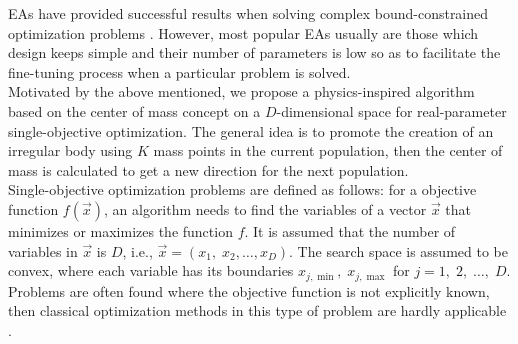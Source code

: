 \documentclass{svproc}
\begin{document}
EAs have provided successful results when solving complex bound-constrained 
optimization problems \cite{ed1995}.  However, most popular EAs usually are 
those which design keeps simple and their number of parameters is low so 
as to facilitate the fine-tuning process when a particular problem is solved. 
\\

Motivated by the above mentioned, we propose a  physics-inspired algorithm 
based on the center of mass concept on a $D$-dimensional space for  
real-parameter single-objective optimization. The general idea is to promote 
the creation of an irregular body using $K$ mass points in the current population, 
then the center of mass is calculated to get a new direction for the next population.\\

Single-objective optimization problems are defined as follows: for a 
objective function $f(\vec{x})$, an algorithm needs to find the variables of a vector $\vec{x}$ 
that minimizes or maximizes the function $f$. It is assumed that the number 
of variables in $\vec{x}$ is $D$, i.e., $\vec{x} = (x_1,\; x_2 , \ldots , x_D )$. 
The search space is assumed to be convex, where each variable has its  boundaries 
$x_{j, \min}, \;  x_{j, \max} $ for $j = 1,\; 2,\; \ldots,\; D$. Problems are often 
found where the objective function is not explicitly known, then classical optimization 
methods in this type of problem are hardly applicable \cite{problemas}.\\
\end{document}
